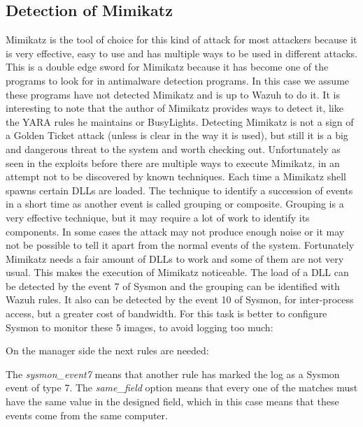 \subsection{Detection of Mimikatz}
Mimikatz is the tool of choice for this kind of attack for most attackers because it is very effective, easy to use and has multiple ways to be used in different attacks\cite{mimikatz_github}\cite{mimikatz_details}. This is a double edge sword for Mimikatz because it has become one of the programs to look for in antimalware detection programs. In this case we assume these programs have not detected Mimikatz and is up to Wazuh to do it. It is interesting to note that the author of Mimikatz provides ways to detect it, like the YARA rules he maintains\cite{mimikatz_github} or BusyLights\cite{understanding_powersploit_mimikatz}.
\linej
\linej
Detecting Mimikatz is not a sign of a Golden Ticket attack (unless is clear in the way it is used), but still it is a big and dangerous threat to the system and worth checking out.
\linej
Unfortunately as seen in the exploits before there are multiple ways to execute Mimikatz, in an attempt not to be discovered by known techniques.
\linej
\linej
Each time a Mimikatz shell spawns certain DLLs are loaded. The technique to identify a succession of events in a short time as another event is called grouping or composite.
Grouping is a very effective technique, but it may require a lot of work to identify its components. In some cases the attack may not produce enough noise or it may not be possible to tell it apart from the normal events of the system\cite{sysmon}\cite{sysmon_event_7_mimikatz}.
\linej
Fortunately Mimikatz needs a fair amount of DLLs to work and some of them are not very usual. This makes the execution of Mimikatz noticeable.
\linej
\linej
 The load of a DLL can be detected by the event 7 of Sysmon and the grouping can be identified with Wazuh rules. It also can be detected by the event 10 of Sysmon, for inter-process access, but a greater cost of bandwidth.
For this task is better to configure Sysmon to monitor these 5 images, to avoid logging too much:
\linej

\linej
On the manager side the next rules are needed:
\linej

The \textit{sysmon\_event7} means that another rule has marked the log as a Sysmon event of type 7.
\linej
The \textit{same\_field} option means that every one of the matches must have the same value in the designed field, which in this case means that these events come from the same computer.
